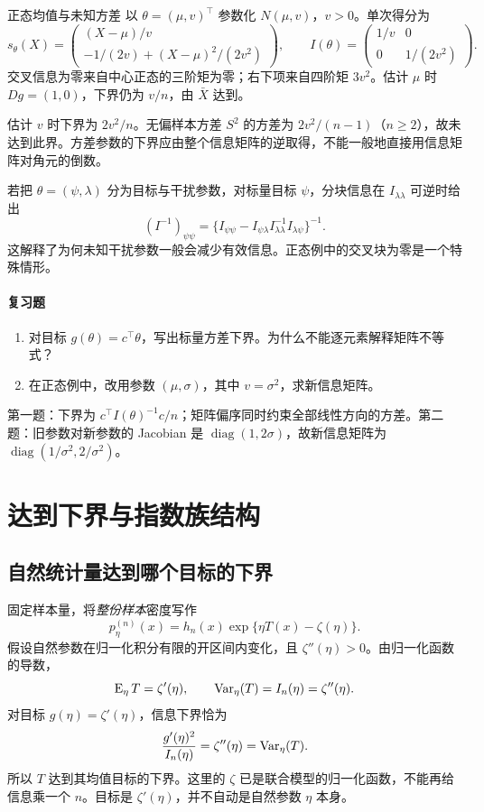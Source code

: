 \begin{examplebox}{正态均值与未知方差}
以 $\theta=(\mu,v)^\top$ 参数化 $N(\mu,v)$，$v>0$。单次得分为
\[
 s_\theta(X)=
 \begin{pmatrix}
 (X-\mu)/v\\[2pt]
 -1/(2v)+(X-\mu)^2/(2v^2)
 \end{pmatrix},
 \qquad
 I(\theta)=
 \begin{pmatrix}1/v&0\\0&1/(2v^2)\end{pmatrix}.
\]
交叉信息为零来自中心正态的三阶矩为零；右下项来自四阶矩 $3v^2$。估计 $\mu$ 时 $Dg=(1,0)$，下界仍为 $v/n$，由 $\bar X$ 达到。

估计 $v$ 时下界为 $2v^2/n$。无偏样本方差 $S^2$ 的方差为 $2v^2/(n-1)$（$n\ge2$），故未达到此界。方差参数的下界应由整个信息矩阵的逆取得，不能一般地直接用信息矩阵对角元的倒数。
\end{examplebox}

若把 $\theta=(\psi,\lambda)$ 分为目标与干扰参数，对标量目标 $\psi$，分块信息在 $I_{\lambda\lambda}$ 可逆时给出
\[
 (I^{-1})_{\psi\psi}
 =\{I_{\psi\psi}-I_{\psi\lambda}
 I_{\lambda\lambda}^{-1}I_{\lambda\psi}\}^{-1}.
\]
这解释了为何未知干扰参数一般会减少有效信息。正态例中的交叉块为零是一个特殊情形。

\paragraph{复习题}
\begin{enumerate}
 \item 对目标 $g(\theta)=c^\top\theta$，写出标量方差下界。为什么不能逐元素解释矩阵不等式？
 \item 在正态例中，改用参数 $(\mu,\sigma)$，其中 $v=\sigma^2$，求新信息矩阵。
\end{enumerate}
\begin{notebox}[答案线索]
第一题：下界为 $c^\top I(\theta)^{-1}c/n$；矩阵偏序同时约束全部线性方向的方差。第二题：旧参数对新参数的 Jacobian 是 $\operatorname{diag}(1,2\sigma)$，故新信息矩阵为 $\operatorname{diag}(1/\sigma^2,2/\sigma^2)$。
\end{notebox}

\section{达到下界与指数族结构}

\subsection{自然统计量达到哪个目标的下界}
固定样本量，将\emph{整份样本}密度写作
\[
 p_\eta^{(n)}(x)=h_n(x)\exp\{\eta T(x)-\zeta(\eta)\}.
\]
假设自然参数在归一化积分有限的开区间内变化，且 $\zeta''(\eta)>0$。由归一化函数的导数，
\[
 \operatorname{E}_\eta T=\zeta'(\eta),\qquad
 \operatorname{Var}_\eta(T)=I_n(\eta)=\zeta''(\eta).
\]
对目标 $g(\eta)=\zeta'(\eta)$，信息下界恰为
\[
 \frac{g'(\eta)^2}{I_n(\eta)}=\zeta''(\eta)=\operatorname{Var}_\eta(T).
\]
所以 $T$ 达到其均值目标的下界。这里的 $\zeta$ 已是联合模型的归一化函数，不能再给信息乘一个 $n$。目标是 $\zeta'(\eta)$，并不自动是自然参数 $\eta$ 本身。

